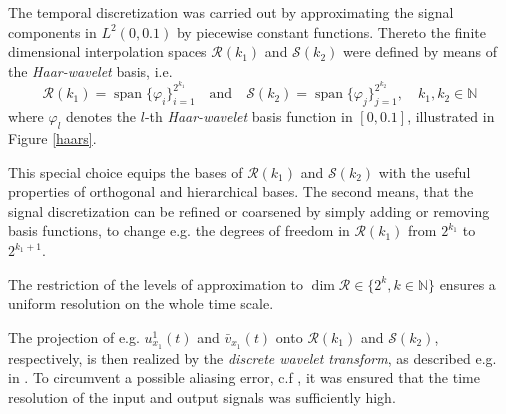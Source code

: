 \documentclass[a4paper,10pt,BCOR=15mm]{scrbook}
\DeclareMathOperator{\spann}{span}
\providecommand{\andi}[0]{\quad \text{and} \quad}
\begin{document}
The temporal discretization was carried out by approximating the signal components in $L^2(0,0.1)$ by piecewise constant functions. Thereto the finite dimensional interpolation spaces $\mathcal R(k_1)$ and $\mathcal S(k_2)$ were defined by means of the \textit{Haar-wavelet} basis, i.e.
\begin{equation}\label{rswav}
 \mathcal R(k_1) = \spann \bigl \{ \varphi_i \bigr \} _{i=1}^{2^{k_1}} \andi 
 \mathcal S(k_2) = \spann \bigl \{ \varphi_j \bigr \} _{j=1}^{2^{k_2}}, \quad k_1,k_2 \in \mathbb N
\end{equation}
where $\varphi_l$ denotes the $l$-th \textit{Haar-wavelet} basis function in $[0,0.1]$, illustrated in Figure \ref{haars}.

This special choice equips the bases of $\mathcal R(k_1)$ and $\mathcal S(k_2)$ with the useful properties of orthogonal and hierarchical bases. The second means, that the signal discretization can be refined or coarsened by simply adding or removing basis functions, to change e.g. the degrees of freedom in $\mathcal R(k_1)$ from $2^{k_1}$ to $2^{k_1+1}$. 

The restriction of the levels of approximation to $\dim \mathcal R \in \{2^k,k\in \mathbb N\}$ ensures a uniform resolution on the whole time scale.

The projection of e.g. $u_{x_1}^1(t)$ and $\bar v_{x_1}(t)$ onto $\mathcal R(k_1)$ and $\mathcal S(k_2)$, respectively, is then realized by the \textit{discrete wavelet transform}, as described e.g. in \cite{wtsp}. To circumvent a possible aliasing error, c.f  \cite[Ch.~1]{cowa}, it was ensured that the time resolution of the input and output signals was sufficiently high. 
\end{document}
